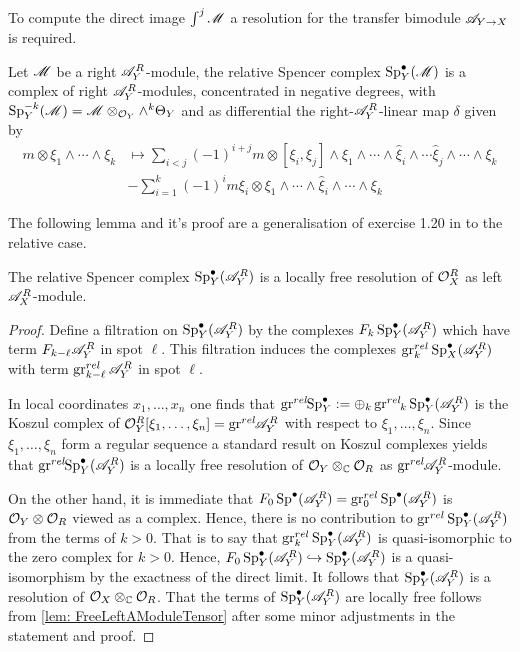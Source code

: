     To compute the direct image $\int^j \mathscr{M}$ a resolution for the transfer bimodule $\mathscr{A}_{Y\to X}$ is required.
    \begin{definition}
        Let $\mathscr{M}$ be a right $\mathscr{A}_Y^R$-module, the relative Spencer complex $\operatorname{Sp}_Y^\bullet(\mathscr{M})$ is a complex of right $\mathscr{A}_Y^R$-modules, concentrated in negative degrees, with $\operatorname{Sp}_Y^{-k}(\mathscr{M}) = \mathscr{M} \otimes_{\mathcal{O}_Y} \wedge^{k}\Theta_Y$ and as differential the right-$\mathscr{A}_Y^R$-linear map $\delta$ given by
        \begin{align*}
            m\otimes \xi_1 \wedge \cdots \wedge \xi_k &\mapsto \sum_{i<j}(-1)^{i+j} m \otimes [\xi_i,\xi_j]\wedge \xi_1 \wedge \cdots \wedge \widehat{\xi}_i \wedge\cdots \widehat{\xi}_j \wedge \cdots \wedge \xi_k\\
            &- \sum_{i=1}^k (-1)^{i} m\xi_i \otimes \xi_1 \wedge \cdots \wedge \widehat{\xi}_i\wedge \cdots \wedge \xi_k
        \end{align*}
    \end{definition}
    The following lemma and it's proof are a generalisation of exercise 1.20 in \cite{sabbah2011introduction} to the relative case.
    \begin{lemma}\label{lem: RelativeSpencerResolvesOXR}
      The relative Spencer complex $\operatorname{Sp}_Y^\bullet(\mathscr{A}_Y^R)$ is a locally free resolution of $\mathcal{O}_X^R$ as left $\mathscr{A}_X^R$-module.
    \end{lemma}
    \begin{proof}
      Define a filtration on $\operatorname{Sp}_Y^\bullet(\mathscr{A}_Y^R)$ by the complexes $F_k\operatorname{Sp}_Y^\bullet(\mathscr{A}_Y^R)$ which have term $F_{k-\ell}\mathscr{A}_Y^R$ in spot $\ell$.
      This filtration induces the complexes $\operatorname{gr}_k^{rel} \operatorname{Sp}_X^\bullet(\mathscr{A}_Y^R)$ with term  $\operatorname{gr}_{k-\ell}^{rel}\mathscr{A}_Y^R$ in spot $\ell$.

      In local coordinates $x_1,\ldots, x_n$ one finds that $\operatorname{gr}^{rel}\mkern-5mu\operatorname{Sp}_Y^\bullet := \oplus_k \operatorname{gr}^{rel}\mkern-5mu_k \operatorname{Sp}_Y^\bullet(\mathscr{A}_Y^R)$ is the Koszul complex of $\mathcal{O}_Y^R[\xi_1,\ldots,\xi_n] = \operatorname{gr}^{rel}\mkern-5mu \mathscr{A}_Y^R$ with respect to  $\xi_1,\ldots, \xi_n$.
      Since $\xi_1,\ldots,\xi_n$ form a regular sequence a standard result on Koszul complexes yields that $\operatorname{gr}^{rel}\mkern-5mu\operatorname{Sp}_Y^\bullet(\mathscr{A}_Y^R)$ is a locally free resolution of $\mathcal{O}_Y\otimes_{\mathbb{C}} \mathcal{O}_R$ as $\operatorname{gr}^{rel}\mkern-5mu \mathscr{A}_Y^R$-module.

      On the other hand, it is immediate that $F_0 \operatorname{Sp}^\bullet(\mathscr{A}_Y^R) = \operatorname{gr}_0^{rel}\operatorname{Sp}^\bullet(\mathscr{A}_Y^R)$ is  $\mathcal{O}_Y\otimes \mathcal{O}_R$ viewed as a complex. Hence, there is no contribution to $\operatorname{gr}^{rel}\operatorname{Sp}_Y^\bullet(\mathscr{A}_Y^R)$ from the terms of $k>0$.
      That is to say that $\operatorname{gr}_k^{rel}\operatorname{Sp}_Y^\bullet(\mathscr{A}_Y^R)$ is quasi-isomorphic to the zero complex for $k>0$.
      Hence, $F_0\operatorname{Sp}_Y^\bullet(\mathscr{A}_Y^R)\hookrightarrow \operatorname{Sp}_Y^\bullet(\mathscr{A}_Y^R)$ is a quasi-isomorphism by the exactness of the direct limit.
      It follows that  $\operatorname{Sp}_Y^\bullet(\mathscr{A}_Y^R)$ is a resolution of $\mathcal{O}_X\otimes_{\mathbb{C}} \mathcal{O}_R$.
      That the terms of $\operatorname{Sp}_Y^\bullet(\mathscr{A}_Y^R)$ are locally free follows from \cref{lem: FreeLeftAModuleTensor} after some minor adjustments in the statement and proof.
    \end{proof}

